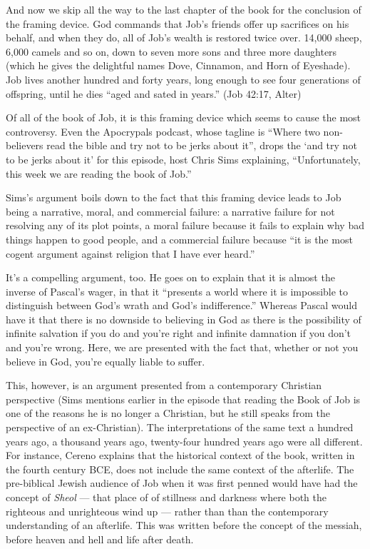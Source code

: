 And now we skip all the way to the last chapter of the book for the conclusion of the framing device. God commands that Job's friends offer up sacrifices on his behalf, and when they do, all of Job's wealth is restored twice over. 14,000 sheep, 6,000 camels and so on, down to seven more sons and three more daughters (which he gives the delightful names Dove, Cinnamon, and Horn of Eyeshade). Job lives another hundred and forty years, long enough to see four generations of offspring, until he dies ``aged and sated in years.'' (Job 42:17, Alter)

Of all of the book of Job, it is this framing device which seems to cause the most controversy. Even the Apocrypals podcast, whose tagline is ``Where two non-believers read the bible and try not to be jerks about it'', drops the `and try not to be jerks about it' for this episode, host Chris Sims explaining, ``Unfortunately, this week we are reading the book of Job.'' \parencite{apocrypals}

Sims's argument boils down to the fact that this framing device leads to Job being a narrative, moral, and commercial failure: a narrative failure for not resolving any of its plot points, a moral failure because it fails to explain why bad things happen to good people, and a commercial failure because ``it is the most cogent argument against religion that I have ever heard.''

It's a compelling argument, too. He goes on to explain that it is almost the inverse of Pascal's wager, in that it ``presents a world where it is impossible to distinguish between God's wrath and God's indifference.'' Whereas Pascal would have it that there is no downside to believing in God as there is the possibility of infinite salvation if you do and you're right and infinite damnation if you don't and you're wrong. Here, we are presented with the fact that, whether or not you believe in God, you're equally liable to suffer.

This, however, is an argument presented from a contemporary Christian perspective (Sims mentions earlier in the episode that reading the Book of Job is one of the reasons he is no longer a Christian, but he still speaks from the perspective of an ex-Christian). The interpretations of the same text a hundred years ago, a thousand years ago, twenty-four hundred years ago were all different. For instance, Cereno explains that the historical context of the book, written in the fourth century BCE, does not include the same context of the afterlife. The pre-biblical Jewish audience of Job when it was first penned would have had the concept of \emph{Sheol} --- that place of of stillness and darkness where both the righteous and unrighteous wind up --- rather than than the contemporary understanding of an afterlife. This was written before the concept of the messiah, before heaven and hell and life after death.

